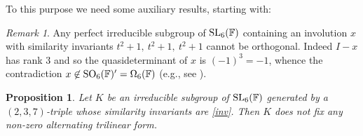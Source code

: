 \documentclass{amsart}
\newtheorem{propo}[lemma]{Proposition}
\theoremstyle{remark}
\newtheorem{rem}[lemma]{Remark}
\begin{document}
To this purpose  we need some auxiliary results, starting with:
\begin{rem}\label{quasidet} Any perfect irreducible subgroup of ${\mathop{\rm SL}\nolimits}_6({\mathbb{F}})$ containing 
an involution $x$ with similarity invariants 
$t^2+1,\ t^ 2+1,\ t^ 2+1$ cannot be orthogonal. Indeed $I-x$ has rank $3$ and so the quasideterminant
of $x$ is $(-1)^3=-1$, whence the contradiction $x\not \in {\mathop{\rm SO}\nolimits}_6({\mathbb{F}})^\prime= \Omega_6({\mathbb{F}})$ (e.g., see
\cite[p. 160]{Tay}).
\end{rem}

\begin{propo}\label{notril6}
Let $K$ be an irreducible subgroup  of ${\mathop{\rm SL}\nolimits}_6({\mathbb{F}})$ generated by 
a $(2,3,7)$-triple whose similarity
invariants are \eqref{inv}. 
Then $K$ does not fix any non-zero alternating trilinear form.
\end{propo}
\end{document}
